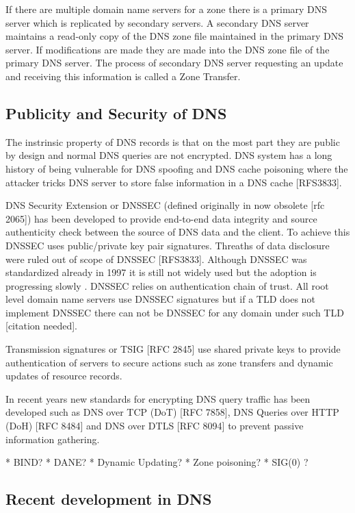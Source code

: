 If there are multiple domain name servers for a zone there is a primary DNS server which is replicated by secondary servers. A secondary DNS server maintains a read-only copy of the DNS zone file maintained in the primary DNS server. If modifications are made they are made into the DNS zone file of the primary DNS server. The process of secondary DNS server requesting an update and receiving this information is called a Zone Transfer. \citep{tanenbaum}

\subsection{Publicity and Security of DNS}
\label{sec:dns_security}

The instrinsic property of DNS records is that on the most part they are public by design and normal DNS queries are not encrypted. DNS system has a long history of being vulnerable for DNS spoofing and DNS cache poisoning where the attacker tricks DNS server to store false information in a DNS cache \cite{tanenbaum} [RFS3833]. 

DNS Security Extension or DNSSEC (defined originally in now obsolete [rfc 2065]) has been developed to provide end-to-end data integrity and source authenticity check between the source of DNS data and the client. To achieve this DNSSEC uses public/private key pair signatures. Threaths of data disclosure were ruled out of scope of DNSSEC [RFS3833]. Although DNSSEC was standardized already in 1997 it is still not widely used but the adoption is progressing slowly \cite{lotr}. DNSSEC relies on authentication chain of trust. All root level domain name servers use DNSSEC signatures but if a TLD does not implement DNSSEC there can not be DNSSEC for any domain under such TLD [citation needed].

Transmission signatures or TSIG [RFC 2845] use shared private keys to provide authentication of servers to secure actions such as zone transfers and dynamic updates of resource records.

In recent years new standards for encrypting DNS query traffic has been developed such as DNS over TCP (DoT) [RFC 7858], DNS Queries over HTTP (DoH) [RFC 8484] and DNS over DTLS [RFC 8094] to prevent passive information gathering. 

* BIND?
* DANE?
* Dynamic Updating?
* Zone poisoning?
* SIG(0) ?

\subsection{Recent development in DNS}

